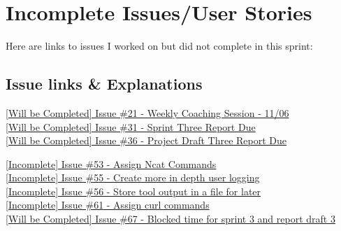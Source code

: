 \documentclass{article}
\begin{document}
\newpage

\section{Incomplete Issues/User Stories}
Here are links to issues I worked on but did not complete in this sprint:
\subsection{Issue links \& Explanations}
\href{https://github.com/zachA214/Adelson_Senior_Capstone/issues/21}{[Will be Completed] Issue \#21 - Weekly Coaching Session - 11/06} \\
\noindent{}
\href{https://github.com/zachA214/Adelson_Senior_Capstone/issues/31}{[Will be Completed] Issue \#31 - Sprint Three Report Due} \\
\noindent{}
\href{https://github.com/zachA214/Adelson_Senior_Capstone/issues/36}{[Will be Completed] Issue \#36 - Project Draft Three Report Due} \\
\noindent{}

\href{https://github.com/zachA214/Adelson_Senior_Capstone/issues/53}{[Incomplete] Issue \#53 - Assign Ncat Commands} \\
\noindent{}
\href{https://github.com/zachA214/Adelson_Senior_Capstone/issues/55}{[Incomplete] Issue \#55 - Create more in depth user logging} \\
\noindent{}
\href{https://github.com/zachA214/Adelson_Senior_Capstone/issues/56}{[Incomplete] Issue \#56 - Store tool output in a file for later} \\
\noindent{}
\href{https://github.com/zachA214/Adelson_Senior_Capstone/issues/61}{[Incomplete] Issue \#61 - Assign curl commands} \\
\noindent{}
\href{https://github.com/zachA214/Adelson_Senior_Capstone/issues/67}{[Will be Completed] Issue \#67 - Blocked time for sprint 3 and report draft 3} \\
\noindent{}
\newpage
\end{document}
